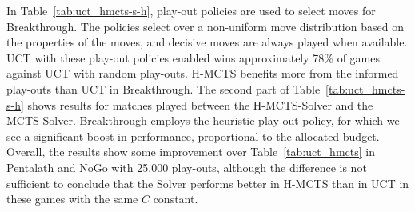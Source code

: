 \documentclass[a4paper]{llncs}
\begin{document}
\begin{table}[ht]
\centering
\tabcolsep=0.3cm
\vspace{4mm}
{\caption{H-MCTS vs. UCT with heuristic play-outs, with/without solver, 1,000 games} \label{tab:uct_hmcts-s-h}}
\end{table}

In Table~\ref{tab:uct_hmcts-s-h}, play-out policies are used to select moves for Breakthrough. The policies select over a non-uniform move distribution based on the properties of the moves, and decisive moves are always played when available. UCT with these play-out policies enabled wins approximately 78\% of games against UCT with random play-outs. H-MCTS benefits more from the informed play-outs than UCT in Breakthrough. The second part of Table~\ref{tab:uct_hmcts-s-h} shows results for matches played between the H-MCTS-Solver and the MCTS-Solver. Breakthrough employs the heuristic play-out policy, for which we see a significant boost in performance, proportional to the allocated budget. Overall, the results show some improvement over Table~\ref{tab:uct_hmcts} in Pentalath and NoGo with 25,000 play-outs, although the difference is not sufficient to conclude that the Solver performs better in H-MCTS than in UCT in these games with the same $C$ constant.
\end{document}
